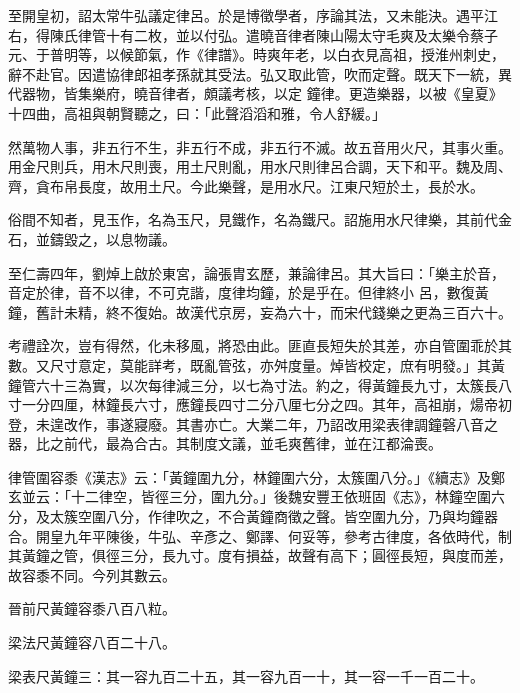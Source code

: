 \begin{pinyinscope}
 至開皇初，詔太常牛弘議定律呂。於是博徵學者，序論其法，又未能決。遇平江右，得陳氏律管十有二枚，並以付弘。遣曉音律者陳山陽太守毛爽及太樂令蔡子元、于普明等，以候節氣，作《律譜》。時爽年老，以白衣見高祖，授淮州刺史，辭不赴官。因遣協律郎祖孝孫就其受法。弘又取此管，吹而定聲。既天下一統，異代器物，皆集樂府，曉音律者，頗議考核，以定
 鐘律。更造樂器，以被《皇夏》十四曲，高祖與朝賢聽之，曰：「此聲滔滔和雅，令人舒緩。」



 然萬物人事，非五行不生，非五行不成，非五行不滅。故五音用火尺，其事火重。用金尺則兵，用木尺則喪，用土尺則亂，用水尺則律呂合調，天下和平。魏及周、齊，貪布帛長度，故用土尺。今此樂聲，是用水尺。江東尺短於土，長於水。



 俗間不知者，見玉作，名為玉尺，見鐵作，名為鐵尺。詔施用水尺律樂，其前代金石，並鑄毀之，以息物議。



 至仁壽四年，劉焯上啟於東宮，論張胄玄歷，兼論律呂。其大旨曰：「樂主於音，音定於律，音不以律，不可克諧，度律均鐘，於是乎在。但律終小
 呂，數復黃鐘，舊計未精，終不復始。故漢代京房，妄為六十，而宋代錢樂之更為三百六十。



 考禮詮次，豈有得然，化未移風，將恐由此。匪直長短失於其差，亦自管圍乖於其數。又尺寸意定，莫能詳考，既亂管弦，亦舛度量。焯皆校定，庶有明發。」其黃鐘管六十三為實，以次每律減三分，以七為寸法。約之，得黃鐘長九寸，太簇長八寸一分四厘，林鐘長六寸，應鐘長四寸二分八厘七分之四。其年，高祖崩，煬帝初登，未遑改作，事遂寢廢。其書亦亡。大業二年，乃詔改用梁表律調鐘磬八音之器，比之前代，最為合古。其制度文議，並毛爽舊律，並在江都淪喪。



 律管圍容黍《漢志》云：「黃鐘圍九分，林鐘圍六分，太簇圍八分。」《續志》及鄭玄並云：「十二律空，皆徑三分，圍九分。」後魏安豐王依班固《志》，林鐘空圍六分，及太簇空圍八分，作律吹之，不合黃鐘商徵之聲。皆空圍九分，乃與均鐘器合。開皇九年平陳後，牛弘、辛彥之、鄭譯、何妥等，參考古律度，各依時代，制其黃鐘之管，俱徑三分，長九寸。度有損益，故聲有高下；圓徑長短，與度而差，故容黍不同。今列其數云。



 晉前尺黃鐘容黍八百八粒。



 梁法尺黃鐘容八百二十八。



 梁表尺黃鐘三：其一容九百二十五，其一容九百一十，其一容一千一百二十。




\end{pinyinscope}
